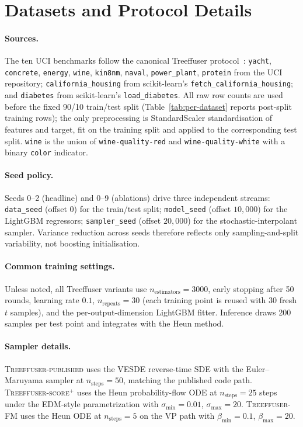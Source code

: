 \documentclass{uai2026}
\begin{document}
\section{Datasets and Protocol Details}\label{app:datasets}

\paragraph{Sources.} The ten UCI benchmarks follow the canonical Treeffuser protocol~\citep{treeffuser}: \texttt{yacht}, \texttt{concrete}, \texttt{energy}, \texttt{wine}, \texttt{kin8nm}, \texttt{naval}, \texttt{power\_plant}, \texttt{protein} from the UCI repository; \texttt{california\_housing} from scikit-learn's \texttt{fetch\_california\_housing}; and \texttt{diabetes} from scikit-learn's \texttt{load\_diabetes}. All raw row counts are used before the fixed 90/10 train/test split (Table~\ref{tab:per-dataset} reports post-split training rows); the only preprocessing is StandardScaler standardisation of features and target, fit on the training split and applied to the corresponding test split. \texttt{wine} is the union of \texttt{wine-quality-red} and \texttt{wine-quality-white} with a binary \texttt{color} indicator.

\paragraph{Seed policy.} Seeds 0--2 (headline) and 0--9 (ablations) drive three independent streams: \texttt{data\_seed} (offset 0) for the train/test split; \texttt{model\_seed} (offset $10{,}000$) for the LightGBM regressors; \texttt{sampler\_seed} (offset $20{,}000$) for the stochastic-interpolant sampler. Variance reduction across seeds therefore reflects only sampling-and-split variability, not boosting initialisation.

\paragraph{Common training settings.} Unless noted, all Treeffuser variants use $n_{\text{estimators}}=3000$, early stopping after 50 rounds, learning rate $0.1$, $n_{\text{repeats}}=30$ (each training point is reused with 30 fresh $t$ samples), and the per-output-dimension LightGBM fitter. Inference draws 200 samples per test point and integrates with the Heun method.

\paragraph{Sampler details.}
\textsc{Treeffuser-published} uses the VESDE reverse-time SDE with the Euler--Maruyama sampler at $n_{\text{steps}}=50$, matching the published code path. \textsc{Treeffuser-score$^+$} uses the Heun probability-flow ODE at $n_{\text{steps}}=25$ steps under the EDM-style parametrization with $\sigma_{\min}=0.01$, $\sigma_{\max}=20$. \textsc{Treeffuser-FM} uses the Heun ODE at $n_{\text{steps}}=5$ on the VP path with $\beta_{\min}=0.1$, $\beta_{\max}=20$.
\end{document}
